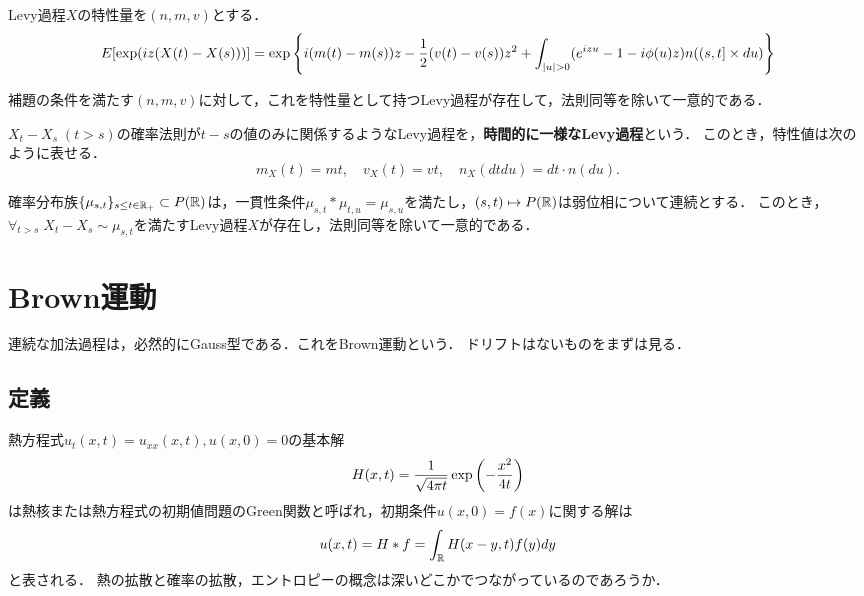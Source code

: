 \documentclass[uplatex,dvipdfmx]{jsreport}
\begin{document}
\begin{theorem}
    Levy過程$X$の特性量を$(n,m,v)$とする．
    \[E[\exp(iz(X(t)-X(s)))]=\exp\left\{i(m(t)-m(s))z-\frac{1}{2}(v(t)-v(s))z^2+\int_{\lvert u\rvert>0}(e^{izu}-1-i\phi(u)z)n((s,t]\times du)\right\}\]
\end{theorem}

\begin{theorem}
    補題の条件を満たす$(n,m,v)$に対して，これを特性量として持つLevy過程が存在して，法則同等を除いて一意的である．
\end{theorem}

\begin{corollary}[時間的に一様な場合]
    $X_t-X_s\;(t>s)$の確率法則が$t-s$の値のみに関係するようなLevy過程を，\textbf{時間的に一様なLevy過程}という．
    このとき，特性値は次のように表せる．
    \[m_X(t)=mt,\quad v_X(t)=vt,\quad n_X(dtdu)=dt\cdot n(du).\]
\end{corollary}

\begin{corollary}[構成定理]\label{cor-construction-of-Levy-process}
    確率分布族$\{\mu_{s,t}\}_{s\le t\in\mathbb{R}_+}\subset P(\mathbb{R})$は，一貫性条件$\mu_{s,t}*\mu_{t,u}=\mu_{s,u}$を満たし，$(s,t)\mapsto P(\mathbb{R})$は弱位相について連続とする．
    このとき，$\forall_{t>s}\;X_t-X_s\sim\mu_{s,t}$を満たすLevy過程$X$が存在し，法則同等を除いて一意的である．
\end{corollary}

\section{Brown運動}

\begin{tcolorbox}[colframe=ForestGreen, colback=ForestGreen!10!white,breakable,colbacktitle=ForestGreen!40!white,coltitle=black,fonttitle=\bfseries\sffamily,
title=]
    連続な加法過程は，必然的にGauss型である．これをBrown運動という．
    ドリフトはないものをまずは見る．
\end{tcolorbox}

\subsection{定義}

\begin{tcolorbox}[colframe=ForestGreen, colback=ForestGreen!10!white,breakable,colbacktitle=ForestGreen!40!white,coltitle=black,fonttitle=\bfseries\sffamily,
title=]
    熱方程式$u_t(x,t)=u_{xx}(x,t),u(x,0)=0$の基本解
    \[H(x,t)=\frac{1}{\sqrt{4\pi t}}\exp\left(-\frac{x^2}{4t}\right)\]
    は熱核または熱方程式の初期値問題のGreen関数と呼ばれ，初期条件$u(x,0)=f(x)$に関する解は
    \[u(x,t)=H*f=\int_{\mathbb{R}} H(x-y,t)f(y)dy\]
    と表される．
    熱の拡散と確率の拡散，エントロピーの概念は深いどこかでつながっているのであろうか．
\end{tcolorbox}
\end{document}
